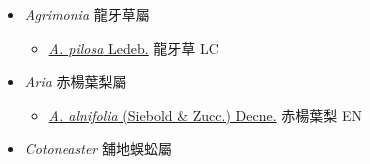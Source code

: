 
  \begin{itemize}
 \item[] \textit{Agrimonia} 龍牙草屬
                    
  \begin{itemize}
        \item[] \href{http://www.theplantlist.org/tpl1.1/search?q=Agrimonia+pilosa}{\textit{A. pilosa} Ledeb.}   龍牙草 LC
  \end{itemize}
 \item[] \textit{Aria} 赤楊葉梨屬
                    
  \begin{itemize}
        \item[] \href{http://www.theplantlist.org/tpl1.1/search?q=Aria+alnifolia}{\textit{A. alnifolia} (Siebold \& Zucc.) Decne.}   赤楊葉梨 EN
  \end{itemize}
 \item[] \textit{Cotoneaster} 舖地蜈蚣屬
                    

\end{itemize}
